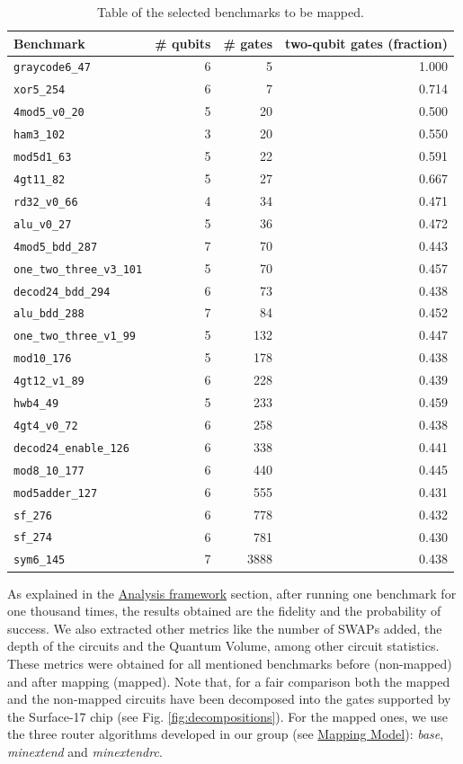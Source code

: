 \begin{table}[htbp]
\caption{\label{tab:map_selected_benchs}
Table of the selected benchmarks to be mapped.}
\centering
\small
\begin{tabular}{lrrr}
\hline
Benchmark & \# qubits & \# gates & two-qubit gates (fraction)\\
\hline
\texttt{graycode6\_47} & 6 & 5 & 1.000\\
\texttt{xor5\_254} & 6 & 7 & 0.714\\
\texttt{4mod5\_v0\_20} & 5 & 20 & 0.500\\
\texttt{ham3\_102} & 3 & 20 & 0.550\\
\texttt{mod5d1\_63} & 5 & 22 & 0.591\\
\texttt{4gt11\_82} & 5 & 27 & 0.667\\
\texttt{rd32\_v0\_66} & 4 & 34 & 0.471\\
\texttt{alu\_v0\_27} & 5 & 36 & 0.472\\
\texttt{4mod5\_bdd\_287} & 7 & 70 & 0.443\\
\texttt{one\_two\_three\_v3\_101} & 5 & 70 & 0.457\\
\texttt{decod24\_bdd\_294} & 6 & 73 & 0.438\\
\texttt{alu\_bdd\_288} & 7 & 84 & 0.452\\
\texttt{one\_two\_three\_v1\_99} & 5 & 132 & 0.447\\
\texttt{mod10\_176} & 5 & 178 & 0.438\\
\texttt{4gt12\_v1\_89} & 6 & 228 & 0.439\\
\texttt{hwb4\_49} & 5 & 233 & 0.459\\
\texttt{4gt4\_v0\_72} & 6 & 258 & 0.438\\
\texttt{decod24\_enable\_126} & 6 & 338 & 0.441\\
\texttt{mod8\_10\_177} & 6 & 440 & 0.445\\
\texttt{mod5adder\_127} & 6 & 555 & 0.431\\
\texttt{sf\_276} & 6 & 778 & 0.432\\
\texttt{sf\_274} & 6 & 781 & 0.430\\
\texttt{sym6\_145} & 7 & 3888 & 0.438\\
\hline
\end{tabular}
\end{table}


As explained in the \href{chapter-4_old.org}{Analysis framework} section, after running one benchmark for one thousand times, the results obtained are the fidelity and the probability of success.
We also extracted other metrics like the number of SWAPs added, the depth of the circuits and the Quantum Volume, among other circuit statistics.
These metrics were obtained for all mentioned benchmarks before (non-mapped) and after mapping (mapped). 
Note that, for a fair comparison both the mapped and the non-mapped circuits have been decomposed into the gates supported by  the Surface-17 chip (see Fig. \ref{fig:decompositions}). 
For the mapped ones, we use the three router algorithms developed in our group (see \hyperref[sec:org19dc500]{Mapping Model}): \textit{base}, \textit{minextend} and \textit{minextendrc}.

